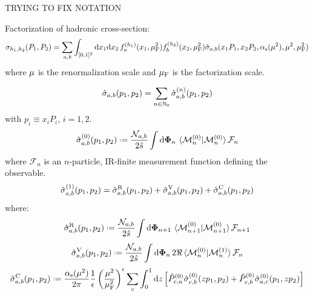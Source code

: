 
TRYING TO FIX NOTATION

Factorization of hadronic cross-section:
\begin{equation*}
  \sigma_{h_1 , h_2}(P_1 , P_2) = \sum_{a,b} \int_{[0,1]^2} \mathrm{d} x_1 \mathrm{d} x_2 \, f_a^{(h_1)}(x_1, \mu_\text{F}^2) f_b^{(h_2)}(x_2, \mu_\text{F}^2) \hat{\sigma}_{a,b}(x_1 P_1, x_2 P_2, \alpha_\text{s}(\mu^2), \mu^2, \mu_\text{F}^2)
\end{equation*}
where $ \mu $ is the renormalization scale and $ \mu_\text{F} $ is the factorization scale.

\begin{equation}
  \hat{\sigma}_{a,b}(p_1 , p_2) = \sum_{n \in \mathbb{N}_0} \hat{\sigma}_{a,b}^{(n)}(p_1 , p_2)
\end{equation}
with $ p_i \equiv x_i P_i $, $ i = 1,2 $.
\begin{equation}
  \pcs_{a,b}^{(0)}(p_1 , p_2) \defeq \frac{\mathcal{N}_{a,b}}{2\hat{s}} \int \lps_n \, \braket{\me_n^{(0)} | \me_n^{(0)}} \mathcal{F}_n
\end{equation}
where $ \mathcal{F}_n $ is an $ n $-particle, IR-finite measurement function defining the observable.
\begin{equation}
  \hat{\sigma}_{a,b}^{(1)}(p_1 , p_2) = \hat{\sigma}_{a,b}^\text{R}(p_1 , p_2) + \hat{\sigma}_{a,b}^\text{V}(p_1 , p_2) + \hat{\sigma}_{a,b}^\text{C}(p_1 , p_2)
\end{equation}
where:
\begin{equation}
  \pcs_{a,b}^\text{R}(p_1 , p_2) \defeq \frac{\mathcal{N}_{a,b}}{2\hat{s}} \int \lps_{n+1} \, \braket{\me_{n+1}^{(0)} | \me_{n+1}^{(0)}} \mathcal{F}_{n+1}
\end{equation}
\begin{equation}
  \pcs_{a,b}^\text{V}(p_1 , p_2) \defeq \frac{\mathcal{N}_{a,b}}{2\hat{s}} \int \lps_n \, 2\Re \braket{\me_n^{(0)} | \me_n^{(1)}} \mathcal{F}_n
\end{equation}
\begin{equation}
  \pcs_{a,b}^\text{C}(p_1 , p_2) \defeq \frac{\rcr}{2\pi} \frac{1}{\de} \left( \frac{\ren^2}{\fac^2} \right)^\de \sum_c \int_0^1 \dd z \left[ \hat{P}_{c,a}^{(0)} \pcs_{c,b}^{(0)}(z p_1 , p_2) + \hat{P}_{c,b}^{(0)} \pcs_{a,c}^{(0)}(p_1 , z p_2) \right]
\end{equation}
